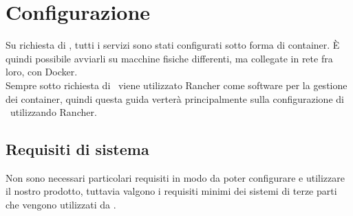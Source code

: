 \section{Configurazione}\label{configurazione}

Su richiesta di \II, tutti i servizi sono stati configurati sotto forma di container. È quindi possibile avviarli su macchine fisiche differenti, ma collegate in rete fra loro, con Docker.\\
Sempre sotto richiesta di \II\ viene utilizzato Rancher come software per la gestione dei container, quindi questa guida verterà principalmente sulla configurazione di \progetto\ utilizzando Rancher. %

\subsection{Requisiti di sistema}

	Non sono necessari particolari requisiti in modo da poter configurare e utilizzare il nostro prodotto, tuttavia valgono i requisiti minimi dei sistemi di terze parti che vengono utilizzati da \progetto.

